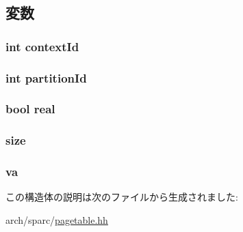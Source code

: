 \subsection{変数}
\hypertarget{structSparcISA_1_1TlbRange_a5093029b16dfe14cea58c94fea417e01}{
\subsubsection[{contextId}]{\setlength{\rightskip}{0pt plus 5cm}int {\bf contextId}}}
\label{structSparcISA_1_1TlbRange_a5093029b16dfe14cea58c94fea417e01}
\hypertarget{structSparcISA_1_1TlbRange_ad4aa59c5467d821ec7f86965aa562c09}{
\subsubsection[{partitionId}]{\setlength{\rightskip}{0pt plus 5cm}int {\bf partitionId}}}
\label{structSparcISA_1_1TlbRange_ad4aa59c5467d821ec7f86965aa562c09}
\hypertarget{structSparcISA_1_1TlbRange_a3e3020dd28f79c09e9d8a078b0fc8a41}{
\subsubsection[{real}]{\setlength{\rightskip}{0pt plus 5cm}bool {\bf real}}}
\label{structSparcISA_1_1TlbRange_a3e3020dd28f79c09e9d8a078b0fc8a41}
\hypertarget{structSparcISA_1_1TlbRange_a8ce507144b5ef53350af753eafb669f0}{
\subsubsection[{size}]{ {\bf size}}}
\label{structSparcISA_1_1TlbRange_a8ce507144b5ef53350af753eafb669f0}
\hypertarget{structSparcISA_1_1TlbRange_ad7b7b7a51bb573c0558da2095596bad8}{
\subsubsection[{va}]{ {\bf va}}}
\label{structSparcISA_1_1TlbRange_ad7b7b7a51bb573c0558da2095596bad8}


この構造体の説明は次のファイルから生成されました:\begin{DoxyCompactItemize}
\item 
arch/sparc/\hyperlink{sparc_2pagetable_8hh}{pagetable.hh}\end{DoxyCompactItemize}
